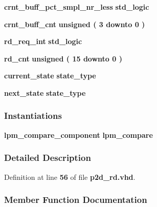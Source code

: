 \begin{DoxyCompactItemize}
\item 
{\bf crnt\+\_\+buff\+\_\+pct\+\_\+smpl\+\_\+nr\+\_\+less} {\bfseries \textcolor{comment}{std\+\_\+logic}\textcolor{vhdlchar}{ }} 
\item 
{\bf crnt\+\_\+buff\+\_\+cnt} {\bfseries \textcolor{comment}{unsigned}\textcolor{vhdlchar}{ }\textcolor{vhdlchar}{(}\textcolor{vhdlchar}{ }\textcolor{vhdlchar}{ } \textcolor{vhdldigit}{3} \textcolor{vhdlchar}{ }\textcolor{keywordflow}{downto}\textcolor{vhdlchar}{ }\textcolor{vhdlchar}{ } \textcolor{vhdldigit}{0} \textcolor{vhdlchar}{ }\textcolor{vhdlchar}{)}\textcolor{vhdlchar}{ }} 
\item 
{\bf rd\+\_\+req\+\_\+int} {\bfseries \textcolor{comment}{std\+\_\+logic}\textcolor{vhdlchar}{ }} 
\item 
{\bf rd\+\_\+cnt} {\bfseries \textcolor{comment}{unsigned}\textcolor{vhdlchar}{ }\textcolor{vhdlchar}{(}\textcolor{vhdlchar}{ }\textcolor{vhdlchar}{ } \textcolor{vhdldigit}{15} \textcolor{vhdlchar}{ }\textcolor{keywordflow}{downto}\textcolor{vhdlchar}{ }\textcolor{vhdlchar}{ } \textcolor{vhdldigit}{0} \textcolor{vhdlchar}{ }\textcolor{vhdlchar}{)}\textcolor{vhdlchar}{ }} 
\item 
{\bf current\+\_\+state} {\bfseries {\bfseries {\bf state\+\_\+type}} \textcolor{vhdlchar}{ }} 
\item 
{\bf next\+\_\+state} {\bfseries {\bfseries {\bf state\+\_\+type}} \textcolor{vhdlchar}{ }} 
\end{DoxyCompactItemize}
\subsubsection*{Instantiations}
 \begin{DoxyCompactItemize}
\item 
{\bf lpm\+\_\+compare\+\_\+component}  {\bfseries lpm\+\_\+compare}   
\end{DoxyCompactItemize}


\subsubsection{Detailed Description}


Definition at line {\bf 56} of file {\bf p2d\+\_\+rd.\+vhd}.



\subsubsection{Member Function Documentation}
